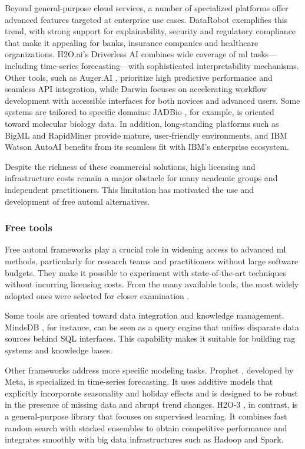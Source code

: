 \documentclass[twoside,final]{Contexto}
\begin{document}
Beyond general-purpose cloud services, a number of specialized platforms offer advanced features targeted at enterprise use cases. DataRobot \cite{DataRobot} exemplifies this trend, with strong support for explainability, security and regulatory compliance that make it appealing for banks, insurance companies and healthcare organizations. H2O.ai’s Driverless AI \cite{DriverlessAI} combines wide coverage of \gls{ml} tasks—including time-series forecasting—with sophisticated interpretability mechanisms. Other tools, such as Auger.AI \cite{AugerAI}, prioritize high predictive performance and seamless API integration, while Darwin \cite{Darwin} focuses on accelerating workflow development with accessible interfaces for both novices and advanced users. Some systems are tailored to specific domains: JADBio \cite{JADBio}, for example, is oriented toward molecular biology data. In addition, long‑standing platforms such as BigML \cite{BigML} and RapidMiner \cite{RapidMiner} provide mature, user‑friendly environments, and IBM Watson AutoAI \cite{Watson} benefits from its seamless fit with IBM’s enterprise ecosystem.

Despite the richness of these commercial solutions, high licensing and infrastructure costs remain a major obstacle for many academic groups and independent practitioners. This limitation has motivated the use and development of free \gls{automl} alternatives.

\subsubsection{Free tools}
\label{subsubsec:free_tools}

Free \gls{automl} frameworks play a crucial role in widening access to advanced \gls{ml} methods, particularly for research teams and practitioners without large software budgets. They make it possible to experiment with state‑of‑the‑art techniques without incurring licensing costs. From the many available tools, the most widely adopted ones were selected for closer examination \cite{palazuelos2024non}.

Some tools are oriented toward data integration and knowledge management. MindsDB \cite{mindsdb}, for instance, can be seen as a query engine that unifies disparate data sources behind SQL interfaces. This capability makes it suitable for building \gls{rag} systems and knowledge bases.

Other frameworks address more specific modeling tasks. Prophet \cite{prophet}, developed by Meta, is specialized in time-series forecasting. It uses additive models that explicitly incorporate seasonality and holiday effects and is designed to be robust in the presence of missing data and abrupt trend changes. H2O-3 \cite{h2o3}, in contrast, is a general-purpose library that focuses on supervised learning. It combines fast random search with stacked ensembles to obtain competitive performance and integrates smoothly with big data infrastructures such as Hadoop and Spark.
\end{document}
